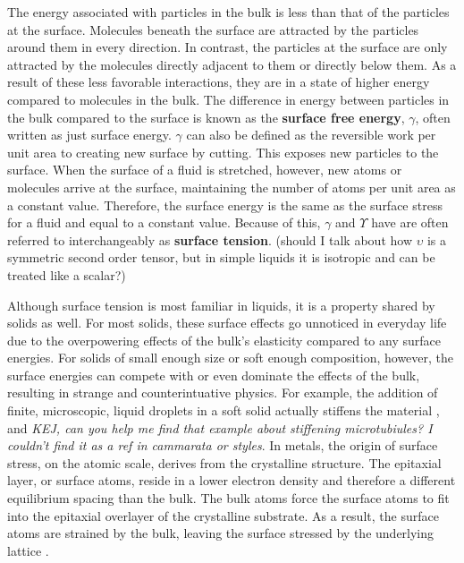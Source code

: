 The energy associated with particles in the bulk is less than that of the particles at the surface. Molecules beneath the surface are attracted by the particles around them in every direction. In contrast, the particles at the surface are only attracted by the molecules directly adjacent to them or directly below them. As a result of these less favorable interactions, they are in a state of higher energy compared to molecules in the bulk. The difference in energy between particles in the bulk compared to the surface is known as the \textbf{surface free energy}, $\gamma$, often written as just surface energy. $\gamma$ can also be defined as the reversible work per unit area to creating new surface by cutting. This exposes new particles to the surface. When the surface of a fluid is stretched, however, new atoms or molecules arrive at the surface, maintaining the number of atoms per unit area as a constant value. Therefore, the surface energy is the same as the surface stress for a fluid and equal to a constant value. Because of this, $\gamma$ and $\Upsilon$ have are often referred to interchangeably as \textbf{surface tension}. (should I talk about how $\upsilon$ is a symmetric second order tensor, but in simple liquids it is isotropic and can be treated like a scalar?) 

Although surface tension is most familiar in liquids, it is a property shared by solids as well. For most solids, these surface effects go unnoticed in everyday life due to the overpowering effects of the bulk's elasticity compared to any surface energies. For solids of small enough size or soft enough composition, however, the surface energies can compete with or even dominate the effects of the bulk, resulting in strange and counterintuative physics. For example, the addition of finite, microscopic, liquid droplets in a soft solid actually stiffens the material \cite{style2015stiffening}, and \emph{KEJ, can you help me find that example about stiffening microtubiules? I couldn't find it as a ref in cammarata or styles}. In metals, the origin of surface stress, on the atomic scale, derives from the crystalline structure. The epitaxial layer, or surface atoms, reside in a lower electron density and therefore a different equilibrium spacing than the bulk. The bulk atoms force the surface atoms to fit into the epitaxial overlayer of the crystalline substrate. As a result, the surface atoms are strained by the bulk, leaving the surface stressed by the underlying lattice \cite{cammarata1994surface}. 


